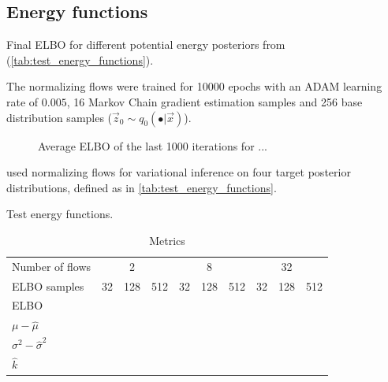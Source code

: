\subsection{Energy functions}

\lipsum[1]

\begin{table}
    \caption{Final ELBO for different potential energy posteriors from \textcite{rezende2015variational} (\cref{tab:test_energy_functions}).}
    \label{tab:energyresults}
    \centering
    
\end{table}

The normalizing flows were trained for 10000 epochs with an ADAM learning rate of $0.005$, 16 Markov Chain gradient estimation samples and 256 base distribution samples ($\Vec z_0 \sim q_0\left(\bullet |\Vec x\right)$).

\begin{figure}
    \centering
    \caption{Average ELBO of the last 1000 iterations for ...}
\end{figure}

\textcite{rezende2015variational} used normalizing flows for variational inference on four target posterior distributions, defined as in \cref{tab:test_energy_functions}.

\begin{table}
\caption{Test energy functions.}
\label{tab:test_energy_functions}

\end{table}

\begin{figure}
    \centering
    \caption{\the\textwidth}
\end{figure}

\lipsum[2]

\lipsum[3]

\begin{table}[htb]
    \centering
    \caption{Metrics}
    \label{tab:efawf}
    \begin{tabular}{lccccccccc} 
    \toprule
    Number of flows             &    & 2   &     &    & 8   &     &    & 32  &      \\ 
    \cmidrule(lr){2-4}\cmidrule(lr){5-7}\cmidrule(l){8-10}
    ELBO samples                & 32 & 128 & 512 & 32 & 128 & 512 & 32 & 128 & 512  \\ 
    \midrule
    ELBO                        &    &     &     &    &     &     &    &     &      \\
    $\mu - \hat{\mu}$           &    &     &     &    &     &     &    &     &      \\
    $\sigma^2 - \hat{\sigma}^2$ &    &     &     &    &     &     &    &     &      \\
    $\hat{k}$                   &    &     &     &    &     &     &    &     &      \\
    \bottomrule
    \end{tabular}
\end{table}


